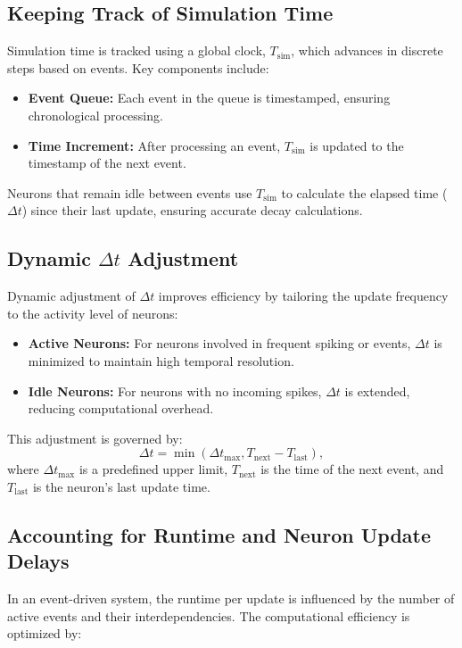 \documentclass[journal]{IEEEtran}
\begin{document}
\subsection{Keeping Track of Simulation Time}

Simulation time is tracked using a global clock, $T_{\text{sim}}$, which advances in discrete steps based on events. Key components include:
\begin{itemize}
    \item \textbf{Event Queue:} Each event in the queue is timestamped, ensuring chronological processing.
    \item \textbf{Time Increment:} After processing an event, $T_{\text{sim}}$ is updated to the timestamp of the next event.
\end{itemize}

Neurons that remain idle between events use $T_{\text{sim}}$ to calculate the elapsed time ($\Delta t$) since their last update, ensuring accurate decay calculations.

\subsection{Dynamic $\Delta t$ Adjustment}

Dynamic adjustment of $\Delta t$ improves efficiency by tailoring the update frequency to the activity level of neurons:
\begin{itemize}
    \item \textbf{Active Neurons:} For neurons involved in frequent spiking or events, $\Delta t$ is minimized to maintain high temporal resolution.
    \item \textbf{Idle Neurons:} For neurons with no incoming spikes, $\Delta t$ is extended, reducing computational overhead.
\end{itemize}

This adjustment is governed by:
\[
\Delta t = \min(\Delta t_{\text{max}}, T_{\text{next}} - T_{\text{last}}),
\]
where $\Delta t_{\text{max}}$ is a predefined upper limit, $T_{\text{next}}$ is the time of the next event, and $T_{\text{last}}$ is the neuron's last update time.


\subsection{Accounting for Runtime and Neuron Update Delays}

In an event-driven system, the runtime per update is influenced by the number of active events and their interdependencies. The computational efficiency is optimized by:
\end{document}
